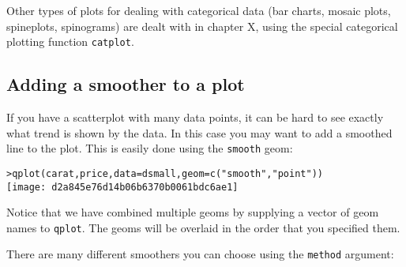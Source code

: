 Other types of plots for dealing with categorical data (bar charts, mosaic plots, spineplots, spinograms) are dealt with in chapter X, using the special categorical plotting function {\tt catplot}.

\subsection{Adding a smoother to a plot}\label{sub:smooth}

If you have a scatterplot with many data points, it can be hard to see exactly what trend is shown by the data.  In this case you may want to add a smoothed line to the plot.  This is easily done using the {\tt smooth} geom:

\begin{alltt}
> qplot(carat, price, data = dsmall, geom = c("smooth", "point"))
\texttt{[image: d2a845e76d14b06b6370b0061bdc6ae1]}

\end{alltt}

Notice that we have combined multiple geoms by supplying a vector of geom names to {\tt qplot}.  The geoms will be overlaid in the order that you specified them.

There are many different smoothers you can choose using the {\tt method} argument:


